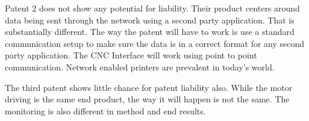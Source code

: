 Patent 2 does not show any potential for liability. 
Their product centers around data being sent through the network using a second party application.  
That is substantially different. 
The way the patent will have to work is use a standard communication setup to make sure the data is in a correct format for any second party application. 
The CNC Interface will work using point to point communication.  
Network enabled printers are prevalent in today’s world.


The third patent shows little chance for patent liability also. 
While the motor driving is the same end product, the way it will happen is not the same. 
The monitoring is also different in method and end results.

